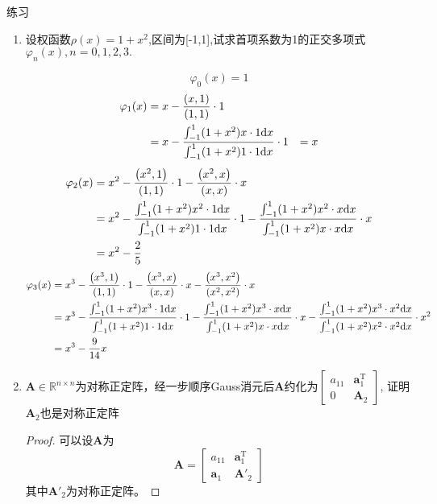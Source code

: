 \begin{example}
    练习
    \begin{enumerate}
        \item 设权函数$\rho(x)=1+x^2$,区间为[-1,1],试求首项系数为1的正交多项式$\varphi_n(x),n=0,1,2,3.$
        \begin{solution}
            \[
                \varphi_0(x)  = 1   
            \]
            \[
                \begin{aligned}
                    \varphi_1(x) &= x-\dfrac{\left( x,1 \right)}{\left( 1,1 \right)}\cdot 1 \\
                    &=x-\dfrac{\int_{-1}^{1}(1+x^2)x\cdot 1\mathrm{d} x}{\int_{-1}^{1}(1+x^2)1\cdot 1\mathrm{d} x} \cdot 1 & = x 
                \end{aligned}
            \]
            \[
                \begin{aligned}
                    \varphi_2(x) &= x^2-\dfrac{\left( x^2,1 \right)}{\left( 1,1 \right)}\cdot 1 - \dfrac{\left( x^2,x \right)}{\left( x,x \right)}\cdot x \\
                    &=x^2-\dfrac{\int_{-1}^{1}(1+x^2)x^2\cdot 1\mathrm{d} x}{\int_{-1}^{1}(1+x^2)1\cdot 1\mathrm{d} x} \cdot 1 -\dfrac{\int_{-1}^{1}(1+x^2)x^2\cdot x\mathrm{d} x}{\int_{-1}^{1}(1+x^2)x\cdot x\mathrm{d} x} \cdot x  \\
                    & = x^2-\dfrac{2}{5}
                \end{aligned}
            \]
            \[
                \begin{aligned}
                    \varphi_3(x) &= x^3-\dfrac{\left( x^3,1 \right)}{\left( 1,1 \right)}\cdot 1 - \dfrac{\left( x^3,x \right)}{\left( x,x \right)}\cdot x - \dfrac{\left( x^3,x^2 \right)}{\left( x^2,x^2 \right)}\cdot x  \\
                    &=x^3-\dfrac{\int_{-1}^{1}(1+x^2)x^3\cdot 1\mathrm{d} x}{\int_{-1}^{1}(1+x^2)1\cdot 1\mathrm{d} x} \cdot 1 -\dfrac{\int_{-1}^{1}(1+x^2)x^3\cdot x\mathrm{d} x}{\int_{-1}^{1}(1+x^2)x\cdot x\mathrm{d} x} \cdot x - \dfrac{\int_{-1}^{1}(1+x^2)x^3\cdot x^2\mathrm{d} x}{\int_{-1}^{1}(1+x^2)x^2\cdot x^2\mathrm{d} x} \cdot x^2 \\
                    & = x^3-\dfrac{9}{14}x
                \end{aligned}
            \]
        \end{solution}
        \item $\boldsymbol{A}\in \mathbb{R}^{n\times n}$为对称正定阵，经一步顺序Gauss消元后$\boldsymbol{A}$约化为$\begin{bmatrix} a_{11}& \boldsymbol{a}_1^{\mathrm{T}}\\ 0& \boldsymbol{A}_2\end{bmatrix}$, 证明$\boldsymbol{A}_2$也是对称正定阵  
        \begin{proof}
            可以设$\boldsymbol{A}$为
            \[
                \boldsymbol{A} = 
                \begin{bmatrix}
                    a_{11} & \boldsymbol{a}_1^{\mathrm{T}}\\
                    \boldsymbol{a}_1 & \boldsymbol{A}'_2
                \end{bmatrix}
            \]
            其中$\boldsymbol{A}'_2$为对称正定阵。


\end{proof}
\end{enumerate}
\end{example}
